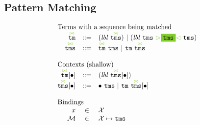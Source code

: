 \documentclass{article}
\newcommand{\cursorColor}{LimeGreen}
\newcommand{\lbl}{\ensuremath{\mathit{lbl}}}
\newcommand{\lbls}{\ensuremath{\mathit{lbls}}}
\newcommand{\tm}{\ensuremath{\mathtt{tm}}}
\newcommand{\tms}{\ensuremath{\mathtt{tms}}}
\newcommand{\Tmc}{\ensuremath{\overset{ \textcolor{\cursorColor}{\bowtie}}{\tm}}}
\newcommand{\Tmcs}{\ensuremath{\overset{\textcolor{\cursorColor}{\bowtie}}{\tms}}}
\newcommand{\mstart}{\ensuremath{\textcolor{\cursorColor}{\rhd}}}
\newcommand{\mend}{\ensuremath{\textcolor{\cursorColor}{\lhd}}}
\newcommand{\bindings}{\ensuremath{\mathcal{M}}}
\newcommand{\select}[1]{\mstart\colorbox{\cursorColor}{$#1$}\mend}
\newcommand{\por}[2]{\ensuremath{#1/#2}}
\newcommand{\pnot}[1]{\ensuremath{\lnot #1}}
\newcommand{\any}{\ensuremath{\text{\underline{\hspace{0.6em}}}}}
\newcommand{\fb}[1]{\ensuremath{\mathop{\rightarrow}(#1)}}
\newcommand{\pin}[1]{\ensuremath{\mathit{In}(#1)}}
\newcommand{\pstart}{\ensuremath{\mathit{Start}}}
\newcommand{\pend}{\ensuremath{\mathit{End}}}
\newcommand{\arrayheading}[2]{\multicolumn{#1}{l}{\mbox{#2}}}
\begin{document}
\subsection{Pattern Matching}

\[
  \begin{array}{rcl}
    \arrayheading{3}{Terms with a sequence being matched}\\
    \Tmc & ::= & (\lbl~\Tmcs) ~|~ (\lbl~\tms~\select{\tms}~\tms)\\
    \Tmcs & ::= & \Tmc ~ \tms ~|~ \tm ~ \Tmcs\\
    \\
    \arrayheading{3}{Contexts (shallow)}\\
    \Tmc[\bullet] & ::= & (\lbl~\Tmcs[\bullet])\\
    \Tmcs[\bullet] & ::= & \bullet ~ \tms ~|~ \tm ~ \Tmcs[\bullet]\\
    \\
    \arrayheading{3}{Bindings}\\
    x         & \in & \mathcal{X}\\
    \bindings & \in & \mathcal{X} \mapsto \tms\\

\end{array}\]
\end{document}

